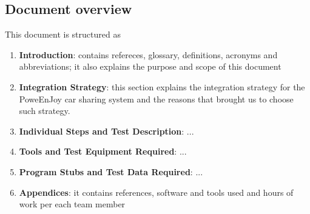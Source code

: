 \subsection{Document overview}
This document is structured as
\begin{enumerate}
	\item \textbf{Introduction}: contains refereces, glossary, definitions, acronyms and abbreviations; it also explains the purpose and scope of this document
	\item \textbf{Integration Strategy}: this section explains the integration strategy for the PoweEnJoy car sharing system and the reasons that brought us to choose such strategy.
	\item \textbf{Individual Steps and Test Description}: ...
	\item \textbf{Tools and Test Equipment Required}: ...
	\item \textbf{Program Stubs and Test Data Required}: ...
	\item \textbf{Appendices}: it contains references, software and tools used and hours of work per each team member
\end{enumerate}